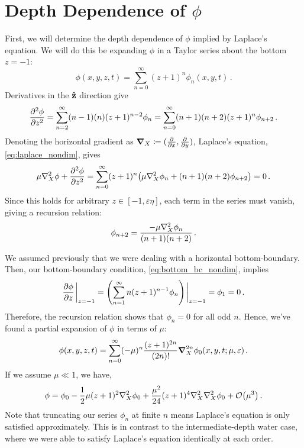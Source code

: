 \documentclass{jfm}
\let\Oldsection\section
\renewcommand{\section}{\FloatBarrier\Oldsection}
\renewcommand*{\epsilon}{\varepsilon}
\begin{document}
\section{Depth Dependence of \texorpdfstring{$\phi$}{Velocity Potential}}
First, we will determine the depth dependence of $\phi$ implied by
Laplace's equation.
We will do this be expanding $\phi$ in a Taylor series about the bottom
$z=-1$:
\begin{equation}
  \phi(x,y,z,t) = \sum_{n=0}^\infty (z+1)^n\phi_n(x,y,t) \,.
\end{equation}
Derivatives in the $\vu{z}$ direction give
\begin{equation}
  \pdv[2]{\phi}{z} = \sum_{n=2}^{\infty} (n-1)(n)(z+1)^{n-2}\phi_n =
  \sum_{n=0}^{\infty} (n+1)(n+2)(z+1)^n\phi_{n+2} \,.
\end{equation}
Denoting the horizontal gradient as $\grad_X \coloneqq
(\pdv{x},\pdv{y})$,
Laplace's equation, \cref{eq:laplace_nondim}, gives
\begin{equation}
  \mu \laplacian_X{\phi} + \pdv[2]{\phi}{z} = \sum_{n=0}^\infty
  (z+1)^n\pqty{\mu \laplacian_X \phi_n + (n+1)(n+2)\phi_{n+2}} = 0 \,.
\end{equation}
Since this holds for arbitrary $z \in [-1,\epsilon \eta]$, each
term in the series must vanish, giving a recursion relation:
\begin{equation}
  \phi_{n+2} = \frac{-\mu \laplacian_X{\phi_n}}{(n+1)(n+2)} \,.
\end{equation}

We assumed previously that we were dealing with a horizontal
bottom-boundary.
Then, our bottom-boundary condition, \cref{eq:bottom_bc_nondim}, implies
\begin{equation}
  \pdv{\phi}{z}\eval_{z=-1} = \pqty{\sum_{n=1}^\infty
  n(z+1)^{n-1}\phi_n}\eval_{z=-1} = \phi_1 = 0 \,.
\end{equation}
Therefore, the recursion relation shows that $\phi_n=0$ for all odd $n$.
Hence, we've found a partial expansion of $\phi$ in terms of $\mu$:
\begin{equation}
  \phi(x,y,z,t) = \sum_{n=0}^{\infty} (-\mu)^n \frac{(z+1)^{2n}}{(2n)!}
  \grad_{X}^{2n} \phi_0(x,y,t; \mu, \epsilon) \,.
  \label{eq:phi_expansion}
\end{equation}
If we assume $\mu \ll 1$, we have,
\begin{equation}
  \phi = \phi_0 - \frac{1}{2}\mu (z+1)^2\laplacian_X\phi_0 +
  \frac{\mu^2}{24}(z+1)^4\laplacian_X\laplacian_X\phi_0 +
  \order{\mu^3} \,.
\end{equation}
Note that truncating our series $\phi_n$ at finite $n$ means
Laplace's equation is only satisfied approximately.
This is in contrast to the intermediate-depth water case, where we were
able to satisfy Laplace's equation identically at each order.
\end{document}
